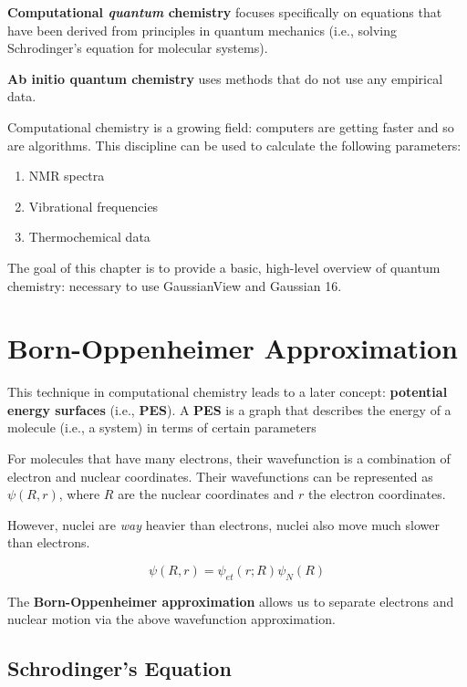 \documentclass[
  letterpaper,
  DIV=11,
  numbers=noendperiod]{scrreprt}
\providecommand{\tightlist}{%
  \setlength{\itemsep}{0pt}\setlength{\parskip}{0pt}}\usepackage{longtable,booktabs,array}
\begin{document}
\textbf{Computational \emph{quantum} chemistry} focuses specifically on
equations that have been derived from principles in quantum mechanics
(i.e., solving Schrodinger's equation for molecular systems).

\textbf{Ab initio quantum chemistry} uses methods that do not use any
empirical data.

Computational chemistry is a growing field: computers are getting faster
and so are algorithms. This discipline can be used to calculate the
following parameters:

\begin{enumerate}
\def\labelenumi{\arabic{enumi}.}
\tightlist
\item
  NMR spectra
\item
  Vibrational frequencies
\item
  Thermochemical data
\end{enumerate}

The goal of this chapter is to provide a basic, high-level overview of
quantum chemistry: necessary to use GaussianView and Gaussian 16.

\hypertarget{born-oppenheimer-approximation}{%
\section{Born-Oppenheimer
Approximation}\label{born-oppenheimer-approximation}}

This technique in computational chemistry leads to a later concept:
\textbf{potential energy surfaces} (i.e., \textbf{PES}). A \textbf{PES}
is a graph that describes the energy of a molecule (i.e., a system) in
terms of certain parameters

For molecules that have many electrons, their wavefunction is a
combination of electron and nuclear coordinates. Their wavefunctions can
be represented as \(\psi(R, r)\), where \(R\) are the nuclear
coordinates and \(r\) the electron coordinates.

However, nuclei are \emph{way} heavier than electrons, nuclei also move
much slower than electrons.

\begin{equation}
  \psi(R, r) = \psi_{et}(r; R)\psi_N(R)
\end{equation}

The \textbf{Born-Oppenheimer approximation} allows us to separate
electrons and nuclear motion via the above wavefunction approximation.

\hypertarget{schrodingers-equation}{%
\subsection{Schrodinger's Equation}\label{schrodingers-equation}}
\end{document}
